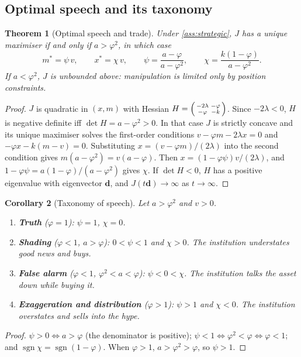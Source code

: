 \documentclass[11pt,a4paper]{article}
\theoremstyle{plain}
\newtheorem{theorem}{Theorem}[section]
\newtheorem{corollary}[theorem]{Corollary}
\theoremstyle{definition}
\theoremstyle{remark}
\DeclareMathOperator{\sgn}{sgn}
\begin{document}
\subsection{Optimal speech and its taxonomy}

\begin{theorem}[Optimal speech and trade]\label{thm:speech}
Under \cref{ass:strategic}, $J$ has a unique maximiser if and only if $a>\varphi^2$, in which case
\[
  m^\ast=\psi\,v,\qquad x^\ast=\chi\,v,\qquad
  \psi=\frac{a-\varphi}{a-\varphi^2},\qquad \chi=\frac{k(1-\varphi)}{a-\varphi^2}.
\]
If $a<\varphi^2$, $J$ is unbounded above: manipulation is limited only by position constraints.
\end{theorem}
\begin{proof}
$J$ is quadratic in $(x,m)$ with Hessian $H=\begin{psmallmatrix}-2\lambda&-\varphi\\-\varphi&-k\end{psmallmatrix}$. Since $-2\lambda<0$, $H$ is negative definite iff $\det H=a-\varphi^2>0$. In that case $J$ is strictly concave and its unique maximiser solves the first-order conditions $v-\varphi m-2\lambda x=0$ and $-\varphi x-k(m-v)=0$. Substituting $x=(v-\varphi m)/(2\lambda)$ into the second condition gives $m(a-\varphi^2)=v(a-\varphi)$. Then $x=(1-\varphi\psi)v/(2\lambda)$, and $1-\varphi\psi=a(1-\varphi)/(a-\varphi^2)$ gives $\chi$. If $\det H<0$, $H$ has a positive eigenvalue with eigenvector $\bm d$, and $J(t\bm d)\to\infty$ as $t\to\infty$.
\end{proof}

\begin{corollary}[Taxonomy of speech]\label{cor:taxonomy}
Let $a>\varphi^2$ and $v>0$.
\begin{enumerate}[label=(\roman*)]
  \item \textbf{Truth} ($\varphi=1$): $\psi=1$, $\chi=0$.
  \item \textbf{Shading} ($\varphi<1$, $a>\varphi$): $0<\psi<1$ and $\chi>0$. The institution understates good news and buys.
  \item \textbf{False alarm} ($\varphi<1$, $\varphi^2<a<\varphi$): $\psi<0<\chi$. The institution talks the asset \emph{down} while buying it.
  \item \textbf{Exaggeration and distribution} ($\varphi>1$): $\psi>1$ and $\chi<0$. The institution overstates and sells into the hype.
\end{enumerate}
\end{corollary}
\begin{proof}
$\psi>0\iff a>\varphi$ (the denominator is positive); $\psi<1\iff\varphi^2<\varphi\iff\varphi<1$; and $\sgn\chi=\sgn(1-\varphi)$. When $\varphi>1$, $a>\varphi^2>\varphi$, so $\psi>1$.
\end{proof}
\end{document}
